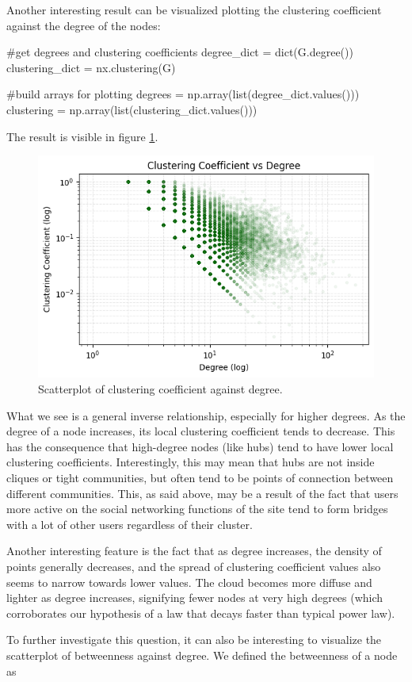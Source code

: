 \documentclass[12pt]{article}
\begin{document}
Another interesting result can be visualized plotting the clustering coefficient against the degree of the nodes:
\begin{py}
	#get degrees and clustering coefficients
	degree_dict = dict(G.degree())
	clustering_dict = nx.clustering(G)
	
	#build arrays for plotting
	degrees = np.array(list(degree_dict.values()))
	clustering = np.array(list(clustering_dict.values()))
\end{py}
The result is visible in figure \ref{fig:screenshot005}.
\begin{figure}[h]
	\centering
	\includegraphics[width=0.6\linewidth]{screenshot005}
	\caption{Scatterplot of clustering coefficient against degree.}
	\label{fig:screenshot005}
\end{figure}
What we see is a general inverse relationship, especially for higher degrees. As the degree of a node increases, its local clustering coefficient tends to decrease. This has the consequence that high-degree nodes (like hubs) tend to have lower local clustering coefficients. Interestingly, this may mean that hubs are not inside cliques or tight communities, but often tend to be points of connection between different communities. This, as said above, may be a result of the fact that users more active on the social networking functions of the site tend to form bridges with a lot of other users regardless of their cluster.\par
Another interesting feature is the fact that as degree increases, the density of points generally decreases, and the spread of clustering coefficient values also seems to narrow towards lower values. The cloud becomes more diffuse and lighter as degree increases, signifying fewer nodes at very high degrees (which corroborates our hypothesis of a law that decays faster than typical power law). \par
To further investigate this question, it can also be interesting to visualize the scatterplot of betweenness against degree. We defined the betweenness of a node as 
\end{document}
